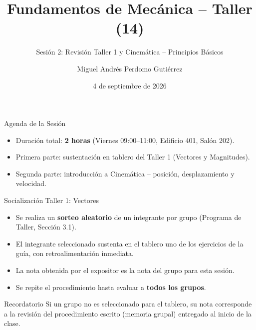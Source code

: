 \documentclass[aspectratio=169,xcolor=dvipsnames]{beamer}
\title{Fundamentos de Mecánica -- Taller (14)}
\subtitle{Sesión 2: Revisión Taller 1 y Cinemática -- Principios Básicos}
\author{Miguel Andrés Perdomo Gutiérrez}
\institute{%
    Auxiliar Docente | M.Sc. en Ciencias -- Física\\
    Universidad Nacional de Colombia -- Sede Bogotá
}
\date{4 de septiembre de 2026}
\begin{document}
\begin{frame}
    \titlepage
\end{frame}

\begin{frame}{Agenda de la Sesión}
\centering
{}

\vspace{0.5cm}
\begin{itemize}
\item Duración total: \textbf{2 horas} (Viernes 09:00--11:00, Edificio 401, Salón 202).
\item Primera parte: sustentación en tablero del Taller 1 (Vectores y Magnitudes).
\item Segunda parte: introducción a Cinemática -- posición, desplazamiento y velocidad.
\end{itemize}
\end{frame}

\begin{frame}{Socialización Taller 1: Vectores}
\begin{itemize}
\item Se realiza un \textbf{sorteo aleatorio} de un integrante por grupo (Programa de Taller, Sección 3.1).
\item El integrante seleccionado sustenta en el tablero uno de los ejercicios de la guía, con retroalimentación inmediata.
\item La nota obtenida por el expositor es la nota del grupo para esta sesión.
\item Se repite el procedimiento hasta evaluar a \textbf{todos los grupos}.
\end{itemize}
\begin{alertblock}{Recordatorio}
Si un grupo no es seleccionado para el tablero, su nota corresponde a la revisión del procedimiento escrito (memoria grupal) entregado al inicio de la clase.
\end{alertblock}
\end{frame}
\end{document}
